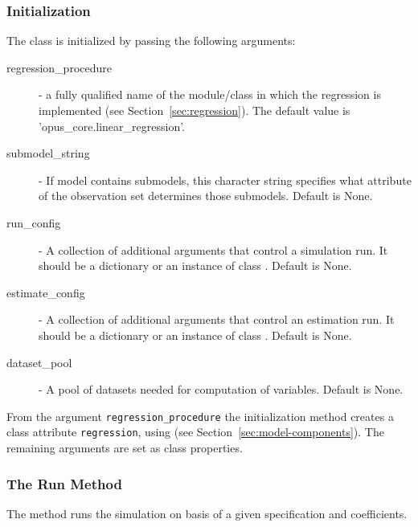 \subsubsection{Initialization}
The class is initialized by passing the following arguments:
\begin{description}
\item[regression_procedure] - a fully qualified name of the module/class in
  which the regression is implemented (see Section~\ref{sec:regression}).
  The default value is 'opus_core.linear_regression'.
\item[submodel_string] - If model contains submodels, this character string
  specifies what attribute of the observation set determines those submodels. Default is None.
\item[run_config] - A collection of additional arguments that control a
  simulation run. It should be a dictionary or an instance of class . Default is None.
\item[estimate_config] - A collection of additional arguments that control an
  estimation run. It should be a dictionary or an instance of class . Default is None.
\item[dataset_pool] - A pool of datasets needed for computation of variables. Default is None.
\end{description}
From the argument \verb|regression_procedure| the initialization method
creates a class attribute \verb|regression|, using
 (see Section~\ref{sec:model-components}).
The remaining arguments are set as class properties.

\subsubsection{The Run Method}
%
The  method runs the simulation on basis of a given
specification and coefficients.

